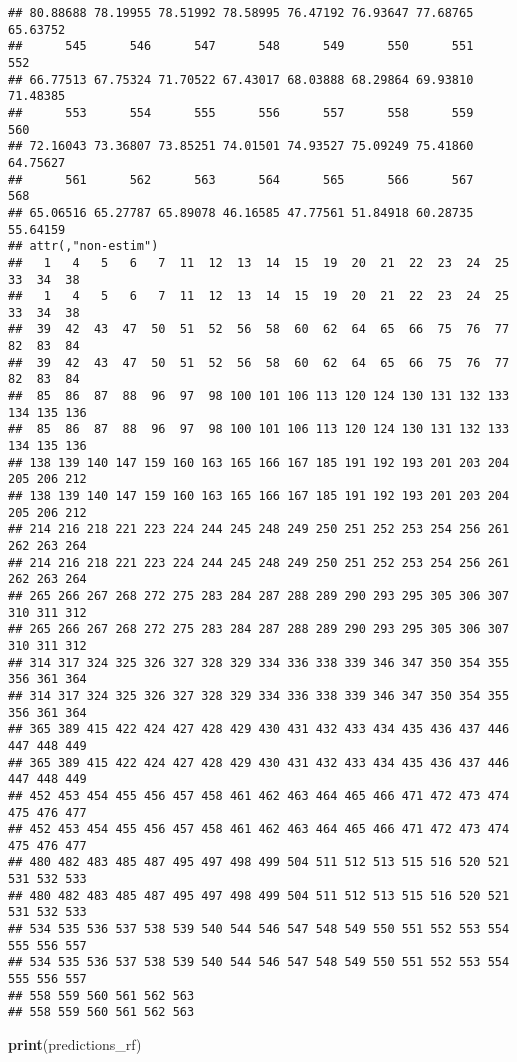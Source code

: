 \documentclass[
]{article}
\newenvironment{Shaded}{\begin{snugshade}}{\end{snugshade}}
\newcommand{\FunctionTok}[1]{\textcolor[rgb]{0.13,0.29,0.53}{\textbf{#1}}}
\newcommand{\NormalTok}[1]{#1}
\begin{document}
\begin{verbatim}
## 80.88688 78.19955 78.51992 78.58995 76.47192 76.93647 77.68765 65.63752 
##      545      546      547      548      549      550      551      552 
## 66.77513 67.75324 71.70522 67.43017 68.03888 68.29864 69.93810 71.48385 
##      553      554      555      556      557      558      559      560 
## 72.16043 73.36807 73.85251 74.01501 74.93527 75.09249 75.41860 64.75627 
##      561      562      563      564      565      566      567      568 
## 65.06516 65.27787 65.89078 46.16585 47.77561 51.84918 60.28735 55.64159 
## attr(,"non-estim")
##   1   4   5   6   7  11  12  13  14  15  19  20  21  22  23  24  25  33  34  38 
##   1   4   5   6   7  11  12  13  14  15  19  20  21  22  23  24  25  33  34  38 
##  39  42  43  47  50  51  52  56  58  60  62  64  65  66  75  76  77  82  83  84 
##  39  42  43  47  50  51  52  56  58  60  62  64  65  66  75  76  77  82  83  84 
##  85  86  87  88  96  97  98 100 101 106 113 120 124 130 131 132 133 134 135 136 
##  85  86  87  88  96  97  98 100 101 106 113 120 124 130 131 132 133 134 135 136 
## 138 139 140 147 159 160 163 165 166 167 185 191 192 193 201 203 204 205 206 212 
## 138 139 140 147 159 160 163 165 166 167 185 191 192 193 201 203 204 205 206 212 
## 214 216 218 221 223 224 244 245 248 249 250 251 252 253 254 256 261 262 263 264 
## 214 216 218 221 223 224 244 245 248 249 250 251 252 253 254 256 261 262 263 264 
## 265 266 267 268 272 275 283 284 287 288 289 290 293 295 305 306 307 310 311 312 
## 265 266 267 268 272 275 283 284 287 288 289 290 293 295 305 306 307 310 311 312 
## 314 317 324 325 326 327 328 329 334 336 338 339 346 347 350 354 355 356 361 364 
## 314 317 324 325 326 327 328 329 334 336 338 339 346 347 350 354 355 356 361 364 
## 365 389 415 422 424 427 428 429 430 431 432 433 434 435 436 437 446 447 448 449 
## 365 389 415 422 424 427 428 429 430 431 432 433 434 435 436 437 446 447 448 449 
## 452 453 454 455 456 457 458 461 462 463 464 465 466 471 472 473 474 475 476 477 
## 452 453 454 455 456 457 458 461 462 463 464 465 466 471 472 473 474 475 476 477 
## 480 482 483 485 487 495 497 498 499 504 511 512 513 515 516 520 521 531 532 533 
## 480 482 483 485 487 495 497 498 499 504 511 512 513 515 516 520 521 531 532 533 
## 534 535 536 537 538 539 540 544 546 547 548 549 550 551 552 553 554 555 556 557 
## 534 535 536 537 538 539 540 544 546 547 548 549 550 551 552 553 554 555 556 557 
## 558 559 560 561 562 563 
## 558 559 560 561 562 563
\end{verbatim}

\begin{Shaded}
\begin{Highlighting}[]
\FunctionTok{print}\NormalTok{(predictions\_rf)}
\end{Highlighting}
\end{Shaded}
\end{document}
